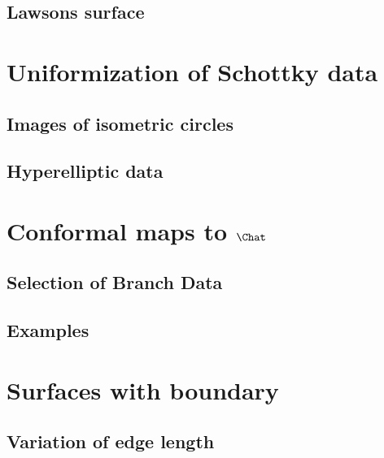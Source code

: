 \subsection{Lawsons surface}

\section{Uniformization of Schottky data}
\subsection{Images of isometric circles}
\subsection{Hyperelliptic data}

\section{Conformal maps to $\Chat$}
\subsection{Selection of Branch Data}
\subsection{Examples}

\section{Surfaces with boundary}
\label{sec:surfaces_with_boundary}
\subsection{Variation of edge length}
